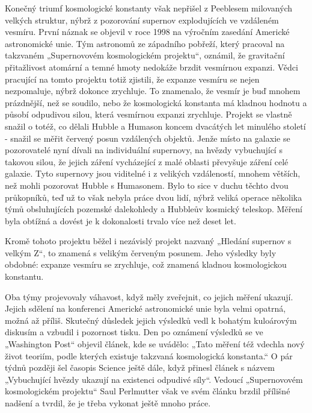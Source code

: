  Konečný triumf kosmologické konstanty však nepřišel z Peeblesem milovaných velkých struktur, nýbrž
  z pozorování supernov explodujících ve vzdáleném vesmíru. První náznak se objevil v roce 1998 na
  výročním zasedání Americké astronomické unie. Tým astronomů ze západního pobřeží, který pracoval
  na takzvaném „Supernovovém kosmologickém projektu“, oznámil, že gravitační přitažlivost atomární a
  temné hmoty nedokáže brzdit vesmírnou expanzi. Vědci pracující na tomto projektu totiž zjistili,
  že expanze vesmíru se nejen nezpomaluje, nýbrž dokonce zrychluje. To znamenalo, že vesmír je buď
  mnohem prázdnější, než se soudilo, nebo že kosmologická konstanta má kladnou hodnotu a působí
  odpudivou silou, která vesmírnou expanzi zrychluje. Projekt se vlastně snažil o totéž, co dělali
  Hubble a Humason koncem dvacátých let minulého století - snažil se měřit červený posun vzdálených
  objektů. Jenže místo na galaxie se pozorovatelé nyní dívali na individuální supernovy, na hvězdy
  vybuchující s takovou silou, že jejich záření vycházející z malé oblasti převyšuje záření celé
  galaxie. Tyto supernovy jsou viditelné i z velikých vzdáleností, mnohem větších, než mohli
  pozorovat Hubble s Humasonem. Bylo to sice v duchu těchto dvou průkopníků, teď už to však nebyla
  práce dvou lidí, nýbrž veliká operace několika týmů obsluhujících pozemské dalekohledy a Hubbleův
  kosmický teleskop. Měření byla obtížná a dovést je k dokonalosti trvalo více než deset let. 
  
  Kromě tohoto projektu běžel i nezávislý projekt nazvaný „Hledání supernov s velkým Z“, to znamená
  s velikým červeným posunem. Jeho výsledky byly obdobné: expanze vesmíru se zrychluje, což znamená
  kladnou kosmologickou konstantu. 
  
  Oba týmy projevovaly váhavost, když měly zveřejnit, co jejich měření ukazují. Jejich sdělení na
  konferenci Americké astronomické unie byla velmi opatrná, možná až příliš. Skutečný důsledek
  jejich výsledků vedl k bohatým kuloárovým diskusím a vzbudil i pozornost tisku. Den po oznámení
  výsledků se ve „Washington Post“ objevil článek, kde se uvádělo: „Tato měření též vdechla nový
  život teoriím, podle kterých existuje takzvaná kosmologická konstanta.“ O pár týdnů později šel
  časopis Science ještě dále, když přinesl článek s názvem „Vybuchující hvězdy ukazují na existenci
  odpudivé síly“. Vedoucí „Supernovovém kosmologickém projektu“ Saul Perlmutter však ve svém článku
  brzdil přílišné nadšení a tvrdil, že je třeba vykonat ještě mnoho práce. 
  
